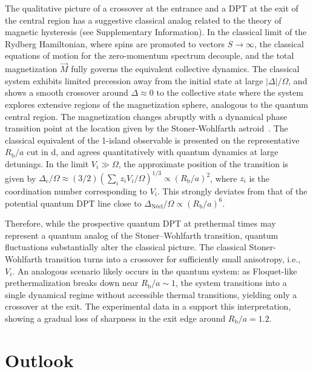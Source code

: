 \documentclass[english,floatfix,twocolumn,showpacs, aps, prx, reprint, superscriptaddress, longbibliography]{revtex4-2}
\begin{document}
The qualitative picture of a crossover at the entrance and a DPT at the exit of the central region has a suggestive classical analog related to the theory of magnetic hysteresis (see Supplementary Information). In the classical limit of the Rydberg Hamiltonian, where spins are promoted to vectors $S \rightarrow \infty$, the classical equations of motion for the zero-momentum spectrum decouple, and the total magnetization $\vec{M}$ fully governs the equivalent collective dynamics. The classical system exhibits limited precession away from the initial state at large $|\Delta|/\Omega$, and shows a smooth crossover around $\Delta \approx 0$ to the collective state where the system explores extensive regions of the magnetization sphere, analogous to the quantum central region. The magnetization changes abruptly with a dynamical phase transition point at the location given by the Stoner-Wohlfarth astroid~\cite{Stoner:1948}. The classical equivalent of the 1-island observable is presented on the representative $R_\mathrm{b}/a$ cut in d, and agrees quantitatively with quantum dynamics at large detunings. In the limit $V_i \gg \Omega$, the approximate position of the transition is given by $\Delta_c / \Omega \approx (3/2) (\sum_i z_i V_i / \Omega)^{1/3} \propto (R_\mathrm{b}/a)^2$, where $z_i$ is the coordination number corresponding to $V_i$. This strongly deviates from that of the potential quantum DPT line close to $\Delta_{\text{N{\'e}el}}/\Omega \propto (R_\mathrm{b}/a)^6$. 

Therefore, while the prospective quantum DPT at prethermal times may represent a quantum analog of the Stoner–Wohlfarth transition, quantum fluctuations substantially alter the classical picture. The classical Stoner-Wohlfarth transition turns into a crossover for sufficiently small anisotropy, i.e., $V_i$. An analogous scenario likely occurs in the quantum system: as Floquet-like prethermalization breaks down near $R_\mathrm{b}/a \sim 1$, the system transitions into a single dynamical regime without accessible thermal transitions, yielding only a crossover at the exit. The experimental data in a support this interpretation, showing a gradual loss of sharpness in the exit edge around $R_\mathrm{b}/a=1.2$.



\section*{Outlook}
\label{sec:outlook}
\end{document}
